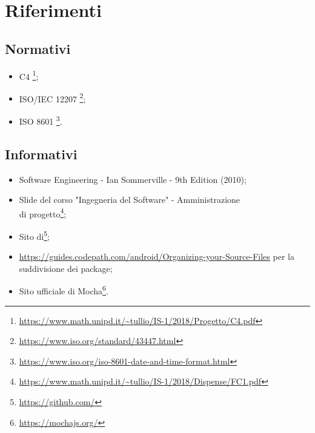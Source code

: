 \section{Riferimenti}
\subsection{Normativi}
\begin{itemize}
	\item {} C4
	\footnote{\url{https://www.math.unipd.it/~tullio/IS-1/2018/Progetto/C4.pdf}};
	
	\item ISO/IEC 12207
	\footnote{\url{https://www.iso.org/standard/43447.html}};
	
	\item ISO 8601
	\footnote{\url{https://www.iso.org/iso-8601-date-and-time-format.html}}.
\end{itemize}
\subsection{Informativi}
\begin{itemize}
	\item Software Engineering - Ian Sommerville - 9th Edition (2010);
	
	\item Slide del corso "Ingegneria del Software" - Amministrazione\\ di progetto\footnote{\url{https://www.math.unipd.it/~tullio/IS-1/2018/Dispense/FC1.pdf}};
	
	\item Sito di\footnote{\url{https://github.com/}};
	\item \url{https://guides.codepath.com/android/Organizing-your-Source-Files} per la suddivisione dei package; \label{package}
	\item Sito ufficiale di Mocha\footnote{\url{https://mochajs.org/}}.
	
\end{itemize}
\newpage
